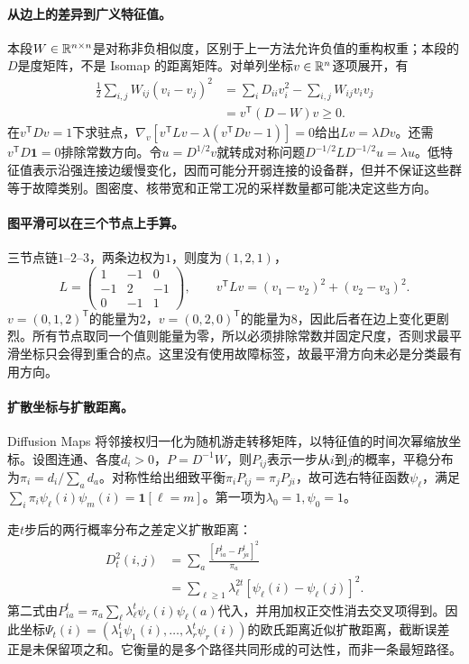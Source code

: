 \paragraph{从边上的差异到广义特征值。}
本段$W\in\mathbb{R}^{n\times n}$是对称非负相似度，区别于上一方法允许负值的重构权重；本段的$D$是度矩阵，不是 Isomap 的距离矩阵。对单列坐标$v\in\mathbb{R}^n$逐项展开，有
\begin{align}
 \frac12\sum_{i,j}W_{ij}(v_i-v_j)^2
 &=\sum_iD_{ii}v_i^2-\sum_{i,j}W_{ij}v_iv_j\\
 &=v^{\mathsf T}(D-W)v\geq0.
\end{align}
在$v^{\mathsf T}Dv=1$下求驻点，$\nabla_v[v^{\mathsf T}Lv-\lambda(v^{\mathsf T}Dv-1)]=0$给出$Lv=\lambda Dv$。还需$v^{\mathsf T}D\mathbf1=0$排除常数方向。令$u=D^{1/2}v$就转成对称问题$D^{-1/2}LD^{-1/2}u=\lambda u$。低特征值表示沿强连接边缓慢变化，因而可能分开弱连接的设备群，但并不保证这些群等于故障类别。图密度、核带宽和正常工况的采样数量都可能决定这些方向。

\paragraph{图平滑可以在三个节点上手算。}
三节点链$1$--$2$--$3$，两条边权为$1$，则度为$(1,2,1)$，
\begin{equation}
 L=\begin{pmatrix}1&-1&0\\-1&2&-1\\0&-1&1\end{pmatrix},\qquad
 v^{\mathsf T}Lv=(v_1-v_2)^2+(v_2-v_3)^2.
\end{equation}
$v=(0,1,2)^{\mathsf T}$的能量为$2$，$v=(0,2,0)^{\mathsf T}$的能量为$8$，因此后者在边上变化更剧烈。所有节点取同一个值则能量为零，所以必须排除常数并固定尺度，否则求最平滑坐标只会得到重合的点。这里没有使用故障标签，故最平滑方向未必是分类最有用方向。

\paragraph{扩散坐标与扩散距离。}
Diffusion Maps 将邻接权归一化为随机游走转移矩阵，以特征值的时间次幂缩放坐标\cite{coifman2006diffusion}。设图连通、各度$d_i>0$，$P=D^{-1}W$，则$P_{ij}$表示一步从$i$到$j$的概率，平稳分布为$\pi_i=d_i/\sum_ad_a$。对称性给出细致平衡$\pi_iP_{ij}=\pi_jP_{ji}$，故可选右特征函数$\psi_\ell$，满足$\sum_i\pi_i\psi_\ell(i)\psi_m(i)=\mathbf1[\ell=m]$。第一项为$\lambda_0=1,\psi_0=1$。

走$t$步后的两行概率分布之差定义扩散距离：
\begin{align}
 D_t^2(i,j)&=\sum_a\frac{[P^t_{ia}-P^t_{ja}]^2}{\pi_a}\\
 &=\sum_{\ell\geq1}\lambda_\ell^{2t}
 [\psi_\ell(i)-\psi_\ell(j)]^2.
\end{align}
第二式由$P^t_{ia}=\pi_a\sum_\ell\lambda_\ell^t\psi_\ell(i)\psi_\ell(a)$代入，并用加权正交性消去交叉项得到。因此坐标$\Psi_t(i)=(\lambda_1^t\psi_1(i),\ldots,\lambda_r^t\psi_r(i))$的欧氏距离近似扩散距离，截断误差正是未保留项之和。它衡量的是多个路径共同形成的可达性，而非一条最短路径。

